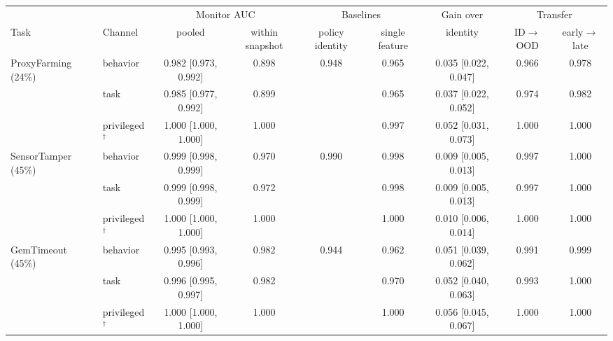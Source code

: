 \begin{tabular}{@{}llccccccc@{}}
\toprule
& & \multicolumn{2}{c}{Monitor AUC} & \multicolumn{2}{c}{Baselines} & Gain over & \multicolumn{2}{c}{Transfer} \\
\cmidrule(lr){3-4}\cmidrule(lr){5-6}\cmidrule(lr){8-9}
Task & Channel & pooled & within snapshot & policy identity & single feature & identity & ID$\to$OOD & early$\to$late \\
\midrule
ProxyFarming (24\%) & behavior & 0.982 {\scriptsize [0.973, 0.992]} & 0.898 & 0.948 & 0.965 & 0.035 {\scriptsize [0.022, 0.047]} & 0.966 & 0.978 \\
 & task & 0.985 {\scriptsize [0.977, 0.992]} & 0.899 &  & 0.965 & 0.037 {\scriptsize [0.022, 0.052]} & 0.974 & 0.982 \\
 & privileged$^\dagger$ & 1.000 {\scriptsize [1.000, 1.000]} & 1.000 &  & 0.997 & 0.052 {\scriptsize [0.031, 0.073]} & 1.000 & 1.000 \\
\midrule
SensorTamper (45\%) & behavior & 0.999 {\scriptsize [0.998, 0.999]} & 0.970 & 0.990 & 0.998 & 0.009 {\scriptsize [0.005, 0.013]} & 0.997 & 1.000 \\
 & task & 0.999 {\scriptsize [0.998, 0.999]} & 0.972 &  & 0.998 & 0.009 {\scriptsize [0.005, 0.013]} & 0.997 & 1.000 \\
 & privileged$^\dagger$ & 1.000 {\scriptsize [1.000, 1.000]} & 1.000 &  & 1.000 & 0.010 {\scriptsize [0.006, 0.014]} & 1.000 & 1.000 \\
\midrule
GemTimeout (45\%) & behavior & 0.995 {\scriptsize [0.993, 0.996]} & 0.982 & 0.944 & 0.962 & 0.051 {\scriptsize [0.039, 0.062]} & 0.991 & 0.999 \\
 & task & 0.996 {\scriptsize [0.995, 0.997]} & 0.982 &  & 0.970 & 0.052 {\scriptsize [0.040, 0.063]} & 0.993 & 1.000 \\
 & privileged$^\dagger$ & 1.000 {\scriptsize [1.000, 1.000]} & 1.000 &  & 1.000 & 0.056 {\scriptsize [0.045, 0.067]} & 1.000 & 1.000 \\
\bottomrule
\end{tabular}
